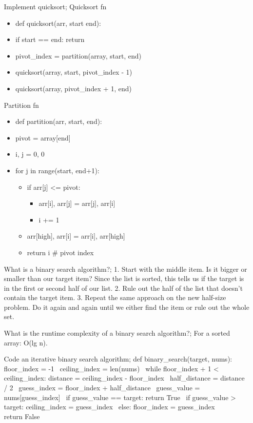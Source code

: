\documentclass{article}
\begin{document}
Implement quicksort; Quicksort fn \begin{itemize} \item def quicksort(arr, start end): \item if start == end: return \item pivot\_index = partition(array, start, end) \item quicksort(array, start, pivot\_index - 1) \item quicksort(array, pivot\_index + 1, end) \end{itemize} Partition fn \begin{itemize} \item def partition(arr, start, end): \item pivot = array[end] \item i, j = 0, 0 \item for j in range(start, end+1): \begin{itemize} \item if arr[j] <= pivot: \begin{itemize} \item arr[i], arr[j] = arr[j], arr[i] \item i += 1 \end{itemize} \item arr[high], arr[i] = arr[i], arr[high] \item return i \# pivot index \end{itemize} \end{itemize}

What is a binary search algorithm?; 1. Start with the middle item. Is it bigger or smaller than our target item? Since the list is sorted, this tells us if the target is in the first or second half of our list. 2. Rule out the half of the list that doesn’t contain the target item. 3. Repeat the same approach on the new half-size problem. Do it again and again until we either find the item or rule out the whole set.

What is the runtime complexity of a binary search algorithm?; For a sorted array: O(lg n).

Code an iterative binary search algorithm; def binary\_search(target, nums): floor\_index = -1 \ ceiling\_index = len(nums) \ while floor\_index + 1 < ceiling\_index: distance = ceiling\_index - floor\_index \ half\_distance = distance / 2 \ guess\_index = floor\_index + half\_distance \ guess\_value = nums[guess\_index] \ if guess\_value == target: return True \ if guess\_value > target: ceiling\_index = guess\_index \ else: floor\_index = guess\_index \\ return False
\end{document}

